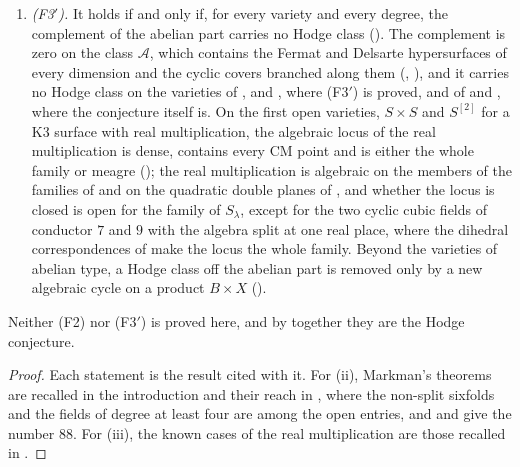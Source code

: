 \begin{theorem}
\begin{enumerate}[label=\textup{(\roman*)},leftmargin=2.6em,itemsep=3pt]
  () and on every member once one Kuga--Satake class is
  algebraic (), or once one complex at one CM point has
  $\Ext^{2}$ of dimension $119$ (); on the
  square of a Mumford fourfold the two exceptional classes are algebraic
  exactly when one class on a product with an abelian sixfold is
  (the sixfold link of \cite{BB26dense}).
\item \emph{(F3$'$).} It holds if and only if, for every variety and every
  degree, the complement of the abelian part carries no Hodge class
  (). The complement is zero on the class $\mathcal{A}$,
  which contains the Fermat and Delsarte hypersurfaces of every dimension and
  the cyclic covers branched along them (,
  ), and it carries no Hodge class on the varieties of
  ,  and
  , where \textup{(F3$'$)} is proved, and of
   and , where the conjecture itself
  is.
  On the first open varieties, $S\times S$ and $S^{[2]}$ for a K3 surface
  with real multiplication, the algebraic locus of the real multiplication
  is dense, contains every CM point and is either the whole family or meagre
  (); the real multiplication is algebraic on the members
  of the families of \cite{vGS25} and on the quadratic double planes of
  \cite{Sch10}, and whether the locus is closed is open for the family of
  $S_{\lambda}$, except for the two cyclic cubic fields of conductor $7$
  and $9$ with the algebra split at one real place, where
  the dihedral correspondences of \cite{BB26dense} make the locus the
  whole family. Beyond the
  varieties of abelian type, a Hodge
  class off the abelian part is removed only by a new algebraic cycle on a
  product $B\times X$ ().
\end{enumerate}
Neither (F2) nor \textup{(F3$'$)} is proved here, and by 
together they are the Hodge conjecture.
\end{theorem}

\begin{proof}
Each statement is the result cited with it. For (ii), Markman's theorems are
recalled in the introduction and their reach in , where the
non-split sixfolds and the fields of degree at least four are among the open
entries, and  and
 give the number $88$. For (iii), the known cases of
the real multiplication are those recalled in .
\end{proof}

